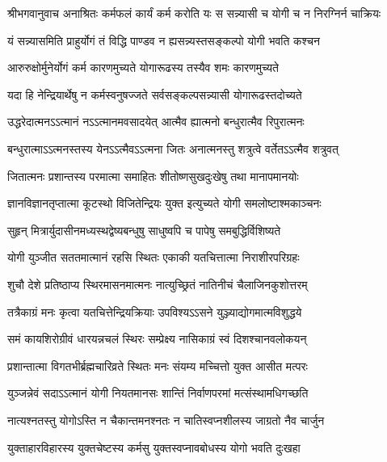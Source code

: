 {श्रीभगवानुवाच}
\twolineshloka
{अनाश्रितः कर्मफलं कार्यं कर्म करोति यः}
{स सन्न्यासी च योगी च न निरग्निर्न चाक्रियः}%

\twolineshloka
{यं सन्न्यासमिति प्राहुर्योगं तं विद्धि पाण्डव}
{न ह्यसन्न्यस्तसङ्कल्पो योगी भवति कश्चन}%

\twolineshloka
{आरुरुक्षोर्मुनेर्योगं कर्म कारणमुच्यते}
{योगारूढस्य तस्यैव शमः कारणमुच्यते}%

\twolineshloka
{यदा हि नेन्द्रियार्थेषु न कर्मस्वनुषज्जते}
{सर्वसङ्कल्पसन्न्यासी योगारूढस्तदोच्यते}%

\twolineshloka
{उद्धरेदात्मनऽऽत्मानं नऽऽत्मानमवसादयेत्}
{आत्मैव ह्यात्मनो बन्धुरात्मैव रिपुरात्मनः}%

\twolineshloka
{बन्धुरात्माऽऽत्मनस्तस्य येनऽऽत्मैवऽऽत्मना जितः}
{अनात्मनस्तु शत्रुत्वे वर्तेतऽऽत्मैव शत्रुवत्}%

\twolineshloka
{जितात्मनः प्रशान्तस्य परमात्मा समाहितः}
{शीतोष्णसुखदुःखेषु तथा मानापमानयोः}%

\twolineshloka
{ज्ञानविज्ञानतृप्तात्मा कूटस्थो विजितेन्द्रियः}
{युक्त इत्युच्यते योगी समलोष्टाश्मकाञ्चनः}%

\twolineshloka
{सुहृन् मित्रार्युदासीनमध्यस्थद्वेष्यबन्धुषु}
{साधुष्वपि च पापेषु समबुद्धिर्विशिष्यते}%

\twolineshloka
{योगी युञ्जीत सततमात्मानं रहसि स्थितः}
{एकाकी यतचित्तात्मा निराशीरपरिग्रहः}%

\twolineshloka
{शुचौ देशे प्रतिष्ठाप्य स्थिरमासनमात्मनः}
{नात्युच्छ्रितं नातिनीचं चैलाजिनकुशोत्तरम्}%

\twolineshloka
{तत्रैकाग्रं मनः कृत्वा यतचित्तेन्द्रियक्रियाः}
{उपविश्यऽऽसने युञ्ज्याद्योगमात्मविशुद्धये}%

\twolineshloka
{समं कायशिरोग्रीवं धारयन्नचलं स्थिरः}
{सम्प्रेक्ष्य नासिकाग्रं स्वं दिशश्चानवलोकयन्}%

\twolineshloka
{प्रशान्तात्मा विगतभीर्ब्रह्मचारिव्रते स्थितः}
{मनः संयम्य मच्चित्तो युक्त आसीत मत्परः}%

\twolineshloka
{युञ्जन्नेवं सदाऽऽत्मानं योगी नियतमानसः}
{शान्तिं निर्वाणपरमां मत्संस्थामधिगच्छति}%

\twolineshloka
{नात्यश्नतस्तु योगोऽस्ति न चैकान्तमनश्नतः}
{न चातिस्वप्नशीलस्य जाग्रतो नैव चार्जुन}%

\twolineshloka
{युक्ताहारविहारस्य युक्तचेष्टस्य कर्मसु}
{युक्तस्वप्नावबोधस्य योगो भवति दुःखहा}%


